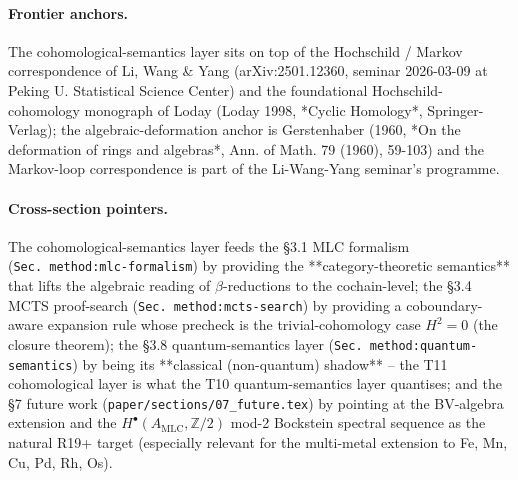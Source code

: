 \paragraph{Frontier anchors.}
The cohomological-semantics layer sits on top of the
Hochschild / Markov correspondence of Li, Wang \& Yang
\cite{lisi2026hochschild} (arXiv:2501.12360, seminar
2026-03-09 at Peking U. Statistical Science Center) and
the foundational Hochschild-cohomology monograph of
Loday (Loday 1998, *Cyclic Homology*, Springer-Verlag);
the algebraic-deformation anchor is Gerstenhaber (1960,
*On the deformation of rings and algebras*,
Ann. of Math. 79 (1960), 59-103) and the Markov-loop
correspondence is part of the Li-Wang-Yang seminar's
programme.

\paragraph{Cross-section pointers.}
The cohomological-semantics layer feeds the §3.1 MLC
formalism (\texttt{Sec.~method:mlc-formalism}) by
providing the **category-theoretic semantics** that lifts
the algebraic reading of $\beta$-reductions to the
cochain-level; the §3.4 MCTS proof-search
(\texttt{Sec.~method:mcts-search}) by providing a
coboundary-aware expansion rule whose precheck is the
trivial-cohomology case $H^2 = 0$ (the closure theorem);
the §3.8 quantum-semantics layer
(\texttt{Sec.~method:quantum-semantics}) by being its
**classical (non-quantum) shadow** -- the T11
cohomological layer is what the T10 quantum-semantics
layer quantises; and the §7 future work
(\texttt{paper/sections/07\_future.tex}) by pointing at
the BV-algebra extension and the
$H^\bullet(A_{\mathrm{MLC}}, \mathbb{Z}/2)$ mod-2
Bockstein spectral sequence as the natural R19+ target
(especially relevant for the multi-metal extension to Fe,
Mn, Cu, Pd, Rh, Os).

\makeatletter
\let\cite\WForigCiteHC
\makeatother
